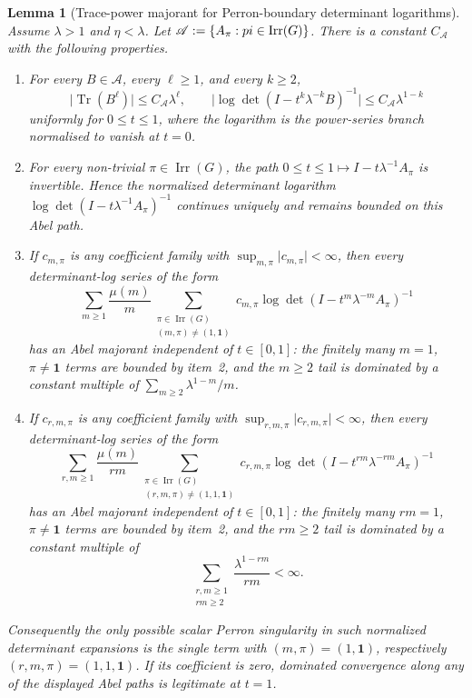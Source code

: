 \documentclass[11pt,a4paper]{amsart}
\theoremstyle{plain}
\newtheorem{lemma}[theorem]{Lemma}
\theoremstyle{definition}
\theoremstyle{remark}
\DeclareMathOperator{\Tr}{Tr}
\DeclareMathOperator{\Irr}{Irr}
\newcommand{\abs}[1]{\lvert #1 \rvert}
\begin{document}
\begin{lemma}[Trace-power majorant for Perron-boundary determinant logarithms]
  \label{lem:perron-boundary-trace-power-majorant}
  Assume \(\lambda>1\) and \(\eta<\lambda\). Let
  \(\mathscr A:=\{A_\pi:\\pi\in\Irr(G)\}\). There is a constant
  \(C_{\mathscr A}\) with the following properties.
  \begin{enumerate}
  \item For every \(B\in\mathscr A\), every \(\ell\ge1\), and every
    \(k\ge2\),
    \begin{equation}\label{eq:trace-power-perron-bound}
      \abs{\Tr(B^\ell)}\le C_{\mathscr A}\lambda^\ell,
      \qquad
      \abs{\log\det(I-t^k\lambda^{-k}B)^{-1}}
      \le C_{\mathscr A}\lambda^{1-k}
    \end{equation}
    uniformly for \(0\le t\le1\), where the logarithm is the power-series
    branch normalised to vanish at \(t=0\).
  \item For every non-trivial \(\pi\in\Irr(G)\), the path
    \(0\le t\le1\mapsto I-t\lambda^{-1}A_\pi\) is invertible. Hence the
    normalized determinant logarithm
    \(\log\det(I-t\lambda^{-1}A_\pi)^{-1}\) continues uniquely and remains
    bounded on this Abel path.
  \item If \(c_{m,\pi}\) is any coefficient family with
    \(\sup_{m,\pi}\abs{c_{m,
    \pi}}<\infty\), then every determinant-log series of the form
    \[
      \sum_{m\ge1}\frac{\mu(m)}{m}
      \sum_{\substack{\pi\in\Irr(G)\\(m,\pi)\neq(1,\mathbf1)}}
        c_{m,\pi}\log\det(I-t^m\lambda^{-m}A_\pi)^{-1}
    \]
    has an Abel majorant independent of \(t\in[0,1]\): the finitely many
    \(m=1\), \(\pi\neq\mathbf1\) terms are bounded by item~2, and the
    \(m\ge2\) tail is dominated by a constant multiple of
    \(\sum_{m\ge2}\lambda^{1-m}/m\).
  \item If \(c_{r,m,
    \pi}\) is any coefficient family with
    \(\sup_{r,m,
    \pi}\abs{c_{r,m,
    \pi}}<\infty\), then every determinant-log series of the form
    \[
      \sum_{r,m\ge1}\frac{\mu(m)}{rm}
      \sum_{\substack{\pi\in\Irr(G)\\(r,m,\pi)\neq(1,1,\mathbf1)}}
        c_{r,m,
        \pi}
        \log\det(I-t^{rm}\lambda^{-rm}A_\pi)^{-1}
    \]
    has an Abel majorant independent of \(t\in[0,1]\): the finitely many
    \(rm=1\), \(\pi\neq\mathbf1\) terms are bounded by item~2, and the
    \(rm\ge2\) tail is dominated by a constant multiple of
    \begin{equation}\label{eq:double-trace-power-majorant}
      \sum_{\substack{r,m\ge1\\rm\ge2}}\frac{\lambda^{1-rm}}{rm}<\infty .
    \end{equation}
  \end{enumerate}
  Consequently the only possible scalar Perron singularity in such
  normalized determinant expansions is the single term with
  \((m,\pi)=(1,\mathbf1)\), respectively
  \((r,m,\pi)=(1,1,\mathbf1)\). If its coefficient is zero, dominated
  convergence along any of the displayed Abel paths is legitimate at
  \(t=1\).
\end{lemma}
\end{document}

